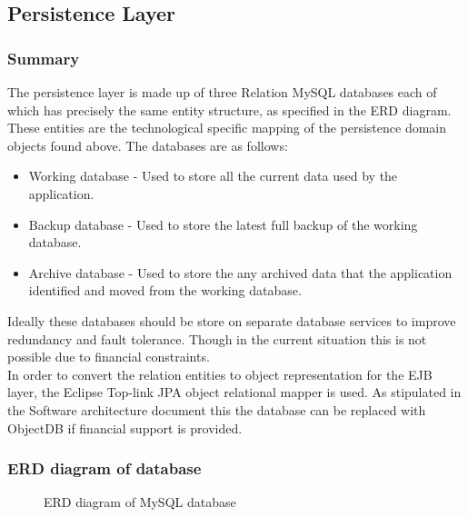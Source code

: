 \documentclass[12pt]{article}
\begin{document}
\newpage
\subsection{Persistence Layer}
\subsubsection{Summary}
The persistence layer is made up of three Relation MySQL databases each of which has precisely the same entity structure, as specified in the ERD diagram. These entities are the technological specific mapping of the persistence domain objects found above. The databases are as follows:
\begin{itemize}
	\item Working database - Used to store all the current data used by the application.
	\item Backup database - Used to store the latest full backup of the working database.
	\item Archive database - Used to store the any archived data that the application identified and moved from the working database. 
\end{itemize}

Ideally these databases should be store on separate database services to improve redundancy and fault tolerance. Though in the current situation this is not possible due to financial constraints.\\
In order to convert the relation entities to object representation for the EJB layer, the Eclipse Top-link JPA object relational mapper is used. As stipulated in the Software architecture document this the database can be replaced with ObjectDB if financial support is provided.
\newpage
\subsubsection{ERD diagram of database}
\begin{figure}[H]
\centering	
{}
\caption{ERD diagram of MySQL database}
\end{figure}
\end{document}
